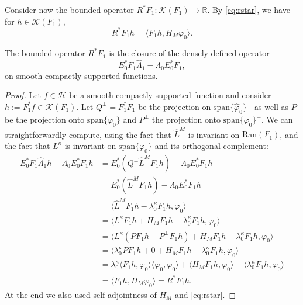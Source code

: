 \documentclass{aptpub}
\newcommand{\R}{\mathbb R}
\newcommand{\Lk}{L^\kappa}
\newcommand{\lspan}{\mathrm{span}}
\renewcommand{\H}{\mathcal H}
\begin{document}
Consider now the bounded operator $R^* F_1: \mathcal K(F_1) \to \R$. By \eqref{eq:rstar}, we have for $h \in \mathcal K(F_1)$,
\begin{equation*}
    R^* F_1 h = \langle F_1 h, H_M \varphi_0 \rangle.
\end{equation*}

\begin{lemma}
 The bounded operator $R^* F_1$ is the closure of the densely-defined operator 
    \begin{equation*}
        E_0^* F_1 \widehat\Lambda_1 - \Lambda_0 E_0^* F_1,
    \end{equation*}
    on smooth compactly-supported functions.
    \label{lemma:R=E0F}
\end{lemma}
\begin{proof}
    Let $f\in \H$ be a smooth compactly-supported function and consider $h := F_1^* f\in \mathcal K(F_1)$. Let $Q^\perp=F_1^*F_1$ be the projection on $\lspan\{\widehat\varphi_0\}^\perp$ as well as $P$ be the projection onto $\lspan\{\varphi_0\}$ and $P^{\perp}$ the projection onto $\lspan\{\varphi_0\}^\perp$. We can straightforwardly compute, using the fact that $\widehat L^M$ is invariant on $\mathrm{Ran}(F_1)$, and the fact that $\Lk$ is invariant on $\lspan\{\varphi_0\}$ and its orthogonal complement:
    \begin{equation*}
        \begin{split}
            E^*_0 F_1 \widehat\Lambda_1 h - \Lambda_0 E_0^* F_1 h &= E_0^* (Q^\perp\widehat L^M F_1 h) - \Lambda_0 E_0^* F_1 h\\
            &= E_0^* (\widehat L^M F_1 h) - \Lambda_0 E_0^* F_1 h\\
            &= \langle \widehat L^M F_1 h - \lambda_0^\kappa F_1 h , \varphi_0\rangle \\
            &= \langle L^\kappa F_1 h + H_M F_1 h -  \lambda_0^\kappa F_1 h , \varphi_0\rangle\\
            &= \langle L^\kappa (P F_1 h +  P^\perp F_1 h) + H_M F_1 h-  \lambda_0^\kappa F_1 h , \varphi_0\rangle\\
            &= \langle \lambda_0^\kappa PF_1 h +0 + H_M F_1 h -  \lambda_0^\kappa F_1 h , \varphi_0\rangle\\
            &= \lambda_0^\kappa\langle F_1 h,\varphi_0\rangle \langle \varphi_0,\varphi_0\rangle  +\langle H_M F_1 h, \varphi_0\rangle - \langle\lambda_0^\kappa F_1 h , \varphi_0\rangle\\
            &= \langle F_1 h, H_M\varphi_0\rangle
            = R^* F_1 h.
        \end{split}
    \end{equation*}
    At the end we also used self-adjointness of $H_M$ and \eqref{eq:rstar}.
\end{proof}
\end{document}
